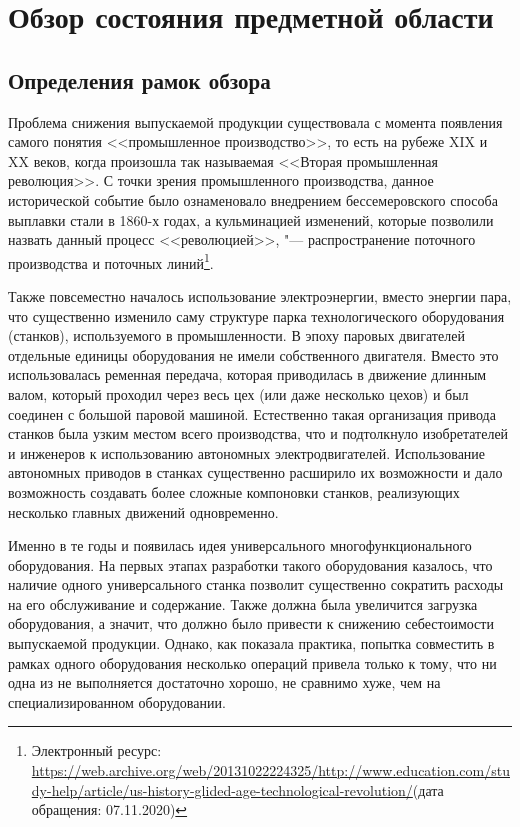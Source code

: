 \chapter{Обзор состояния предметной области}\label{ch:ch1}

\section{Определения рамок обзора}\label{sec:ch1/sec1}

Проблема снижения выпускаемой продукции существовала с момента появления самого понятия <<промышленное производство>>, то есть на рубеже XIX и XX веков, когда произошла так называемая <<Вторая промышленная революция>>. С точки зрения промышленного производства, данное исторической событие было ознаменовало внедрением бессемеровского способа выплавки стали в 1860-х годах, а кульминацией изменений, которые позволили назвать данный процесс <<революцией>>, "--- распространение поточного производства и поточных линий\footnote{Электронный ресурс: \url{https://web.archive.org/web/20131022224325/http://www.education.com/study-help/article/us-history-glided-age-technological-revolution/}(дата обращения: 07.11.2020)}.

Также повсеместно началось использование электроэнергии, вместо энергии пара, что существенно изменило саму структуре парка технологического оборудования (станков), используемого в промышленности. В эпоху паровых двигателей отдельные единицы оборудования не имели собственного двигателя. Вместо это использовалась ременная передача, которая приводилась в движение длинным валом, который проходил через весь цех (или даже несколько цехов) и был соединен с большой паровой машиной. Естественно такая организация привода станков была узким местом всего производства, что и подтолкнуло изобретателей и инженеров к использованию автономных электродвигателей. Использование автономных приводов в станках существенно расширило их возможности и дало возможность создавать более сложные компоновки станков, реализующих несколько главных движений одновременно. 

Именно в те годы и появилась идея универсального многофункционального оборудования. На первых этапах разработки такого оборудования казалось, что наличие одного универсального станка позволит существенно сократить расходы на его обслуживание и содержание. Также должна была увеличится загрузка оборудования, а значит, что должно было привести к снижению себестоимости выпускаемой продукции. Однако, как показала практика, попытка совместить в рамках одного оборудования несколько операций привела только к тому, что ни одна из не выполняется достаточно хорошо, не сравнимо хуже, чем на специализированном оборудовании. 

